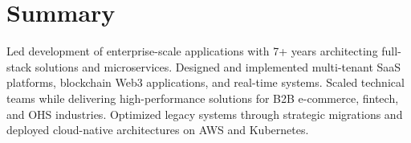 \documentclass[letterpaper,11pt]{article}
\begin{document}





\section{Summary}
  Led development of enterprise-scale applications with 7+ years architecting full-stack solutions and microservices. 
  Designed and implemented multi-tenant SaaS platforms, blockchain Web3 applications, and real-time systems. 
  Scaled technical teams while delivering high-performance solutions for B2B e-commerce, fintech, and OHS industries. 
  Optimized legacy systems through strategic migrations and deployed cloud-native architectures on AWS and Kubernetes.









\end{document}
